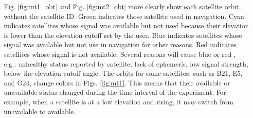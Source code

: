 \documentclass[letterpaper, 10 pt,onecolumn]{article}
\begin{document}
	Fig. \ref{fig:mt1_obt} and Fig. \ref{fig:mt2_obt} more clearly show each satellite orbit, without the satellite ID. 
	Green indicates those satellite  used in navigation. 
	Cyan indicates satellites whose signal was available but not used because their elevation is \red lower than the elevation cutoff set by the user. \black
	Blue indicates satellites whose signal was available but not use in navigation for other reasons. 
	Red  indicates satellites whose signal is not available. 
	Several reasons will cause blue or red \cite{ucenter}, e.g.: unhealthy status reported by satellite, lack of ephemeris, low signal strength, below the elevation cutoff angle. 
	The orbits for some satellites, such as B21, E5, and G24, change colors in Figs. \ref{fig:mt1}.
	This means that their available or unavailable status changed during the time interval of the experiment.
	For example, when a satellite is at a low elevation and rising, it may switch from unavailable to available. 
\end{document}
